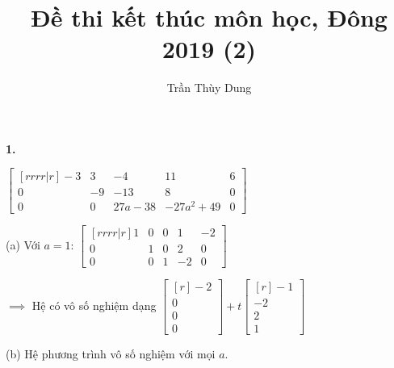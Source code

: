 \documentclass{article}
\title{Đề thi kết thúc môn học, Đông 2019 (2)}
\author{Trần Thùy Dung}
\date{}
\begin{document}
    \maketitle

    \begin{minipage}[t]{0.45\linewidth}
    \textbf{1.} 

    $ \begin{bmatrix}[rrrr|r]
        -3 & 3 & -4 & 11 & 6 \\
        0 & -9 & -13 & 8 & 0 \\
        0 & 0  & 27a - 38 & -27a^2 + 49 & 0 
    \end{bmatrix} $

    (a) Với $a = 1$: $ \begin{bmatrix}[rrrr|r]
        1 & 0 & 0 & 1 & -2 \\
        0 & 1 & 0 & 2 & 0 \\
        0 & 0 & 1  & -2 & 0 
    \end{bmatrix} $

    $\implies$ Hệ có vô số nghiệm dạng $  \begin{bmatrix}[r]
        -2 \\ 0 \\ 0 \\ 0 
    \end{bmatrix} + t \begin{bmatrix}[r]
        -1 \\
        -2 \\
        2 \\
        1 
    \end{bmatrix} $

    (b) Hệ phương trình vô số nghiệm với mọi $a$.

        
    \end{minipage} \hfill
\end{document}
